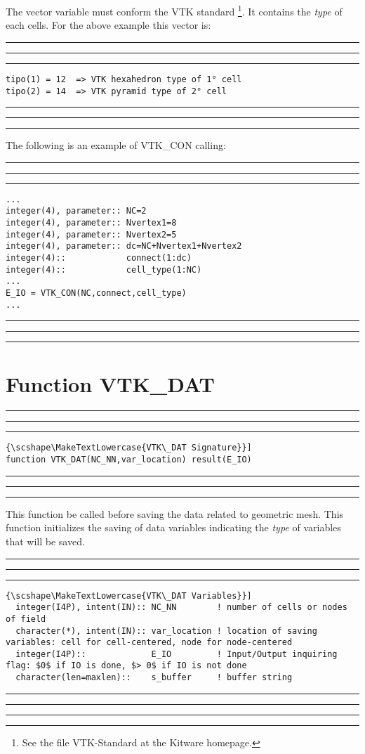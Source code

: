 \documentclass[pagesize=pdftex,fontsize=10pt,paper=a4,oneside]{scrbook}
\DeclareRobustCommand{\MarginNote}[1]{\marginpar{%
\slshape\footnotesize%
\parindent=0pt\lineskip=0pt\lineskiplimit=0pt%
\tolerance=2000\hyphenpenalty=300\exhyphenpenalty=300%
\doublehyphendemerits=100000\finalhyphendemerits=\doublehyphendemerits%
\raggedright\hspace{0pt}#1}}
\newenvironment{boxred}[1]%
               {%
                \noindent\hspace*{-0.025\textwidth}%
                \color{Maroon}%
                \rule[-5.8pt]{0.6pt}{6pt}\hspace*{-0.6pt}\rule{1.05\textwidth}{0.6pt}\hspace*{-0.6pt}\rule[-5.8pt]{0.6pt}{6pt}%
                \color{black}%
                \vspace*{0.6pt}\MarginNote{\color{Maroon}{#1}}%
               }%
               {%
                \noindent\hspace*{-0.025\textwidth}%
                \color{Maroon}%
                \rule[0pt]{0.6pt}{6pt}\hspace*{-0.6pt}\rule{1.05\textwidth}{0.6pt}\hspace*{-0.6pt}\rule[0pt]{0.6pt}{6pt}%
                \color{black}%
                \vspace*{2mm}%
               }
\DeclareRobustCommand{\MaiuscolettoBS}[1]{\textls[80]{\scshape\MakeTextLowercase{#1}}}
\begin{document}
The vector variable \MaiuscolettoBS{tipo} must conform the VTK standard \footnote{See the file VTK-Standard at the Kitware
homepage.}. It contains the \emph{type} of each cells. For the above example this vector is:

\begin{boxred}{Cell-Type vector example for VTK legacy standard}
\begin{verbatim}
tipo(1) = 12  => VTK hexahedron type of 1° cell
tipo(2) = 14  => VTK pyramid type of 2° cell
\end{verbatim}
\end{boxred}

The following is an example of VTK\_CON calling:

\begin{boxred}{VTK\_CON Calling}
\begin{verbatim}
...
integer(4), parameter:: NC=2
integer(4), parameter:: Nvertex1=8
integer(4), parameter:: Nvertex2=5
integer(4), parameter:: dc=NC+Nvertex1+Nvertex2
integer(4)::            connect(1:dc)
integer(4)::            cell_type(1:NC)
...
E_IO = VTK_CON(NC,connect,cell_type)
...
\end{verbatim}
\end{boxred}


\section{Function VTK\_DAT}
\label{fun:VTK_DAT}
 
 
\begin{boxred}{}
\begin{lstlisting}[style=signature,title=\color{Maroon}\MaiuscolettoBS{VTK\_DAT Signature}]
function VTK_DAT(NC_NN,var_location) result(E_IO)
\end{lstlisting}
\end{boxred}
 
This function \MaiuscolettoBS{must} be called before saving the data related to geometric mesh. This function initializes the
saving of data variables indicating the \emph{type} of variables that will be saved.


 
\begin{boxred}{}
\begin{lstlisting}[style=variables,title=\color{Maroon}\MaiuscolettoBS{VTK\_DAT Variables}]
  integer(I4P), intent(IN):: NC_NN        ! number of cells or nodes of field
  character(*), intent(IN):: var_location ! location of saving variables: cell for cell-centered, node for node-centered
  integer(I4P)::             E_IO         ! Input/Output inquiring flag: $0$ if IO is done, $> 0$ if IO is not done
  character(len=maxlen)::    s_buffer     ! buffer string
\end{lstlisting}

\end{boxred}
 
\end{document}
